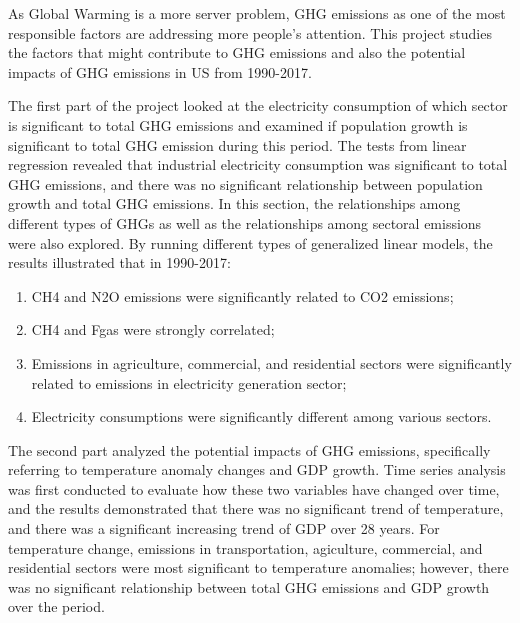 \documentclass[12pt,]{article}
\providecommand{\tightlist}{%
  \setlength{\itemsep}{0pt}\setlength{\parskip}{0pt}}
\begin{document}
As Global Warming is a more server problem, GHG emissions as one of the
most responsible factors are addressing more people's attention. This
project studies the factors that might contribute to GHG emissions and
also the potential impacts of GHG emissions in US from 1990-2017.

The first part of the project looked at the electricity consumption of
which sector is significant to total GHG emissions and examined if
population growth is significant to total GHG emission during this
period. The tests from linear regression revealed that industrial
electricity consumption was significant to total GHG emissions, and
there was no significant relationship between population growth and
total GHG emissions. In this section, the relationships among different
types of GHGs as well as the relationships among sectoral emissions were
also explored. By running different types of generalized linear models,
the results illustrated that in 1990-2017:

\begin{enumerate}
\def\labelenumi{\arabic{enumi}.}
\tightlist
\item
  CH4 and N2O emissions were significantly related to CO2 emissions;\\
\item
  CH4 and Fgas were strongly correlated;\\
\item
  Emissions in agriculture, commercial, and residential sectors were
  significantly related to emissions in electricity generation sector;\\
\item
  Electricity consumptions were significantly different among various
  sectors.
\end{enumerate}

The second part analyzed the potential impacts of GHG emissions,
specifically referring to temperature anomaly changes and GDP growth.
Time series analysis was first conducted to evaluate how these two
variables have changed over time, and the results demonstrated that
there was no significant trend of temperature, and there was a
significant increasing trend of GDP over 28 years. For temperature
change, emissions in transportation, agiculture, commercial, and
residential sectors were most significant to temperature anomalies;
however, there was no significant relationship between total GHG
emissions and GDP growth over the period.
\end{document}
